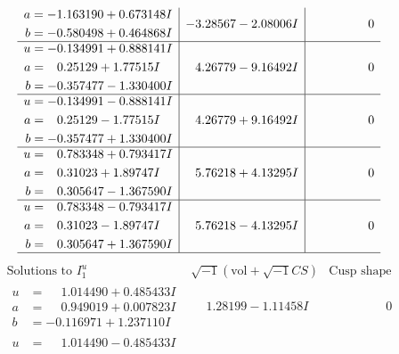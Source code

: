 \documentclass[1p]{elsarticle_modified}
\theoremstyle{definition}
\newcommand{\I}{\sqrt{-1}}
\begin{document}
$$\begin{array}{c|c|c}
\begin{aligned}
a &= -1.163190 + 0.673148 I \\
b &= -0.580498 + 0.464868 I\end{aligned}
 & -3.28567 - 2.08006 I & \phantom{-0.000000 } 0 \\ \hline\begin{aligned}
u &= -0.134991 + 0.888141 I \\
a &= \phantom{-}0.25129 + 1.77515 I \\
b &= -0.357477 - 1.330400 I\end{aligned}
 & \phantom{-}4.26779 - 9.16492 I & \phantom{-0.000000 } 0 \\ \hline\begin{aligned}
u &= -0.134991 - 0.888141 I \\
a &= \phantom{-}0.25129 - 1.77515 I \\
b &= -0.357477 + 1.330400 I\end{aligned}
 & \phantom{-}4.26779 + 9.16492 I & \phantom{-0.000000 } 0 \\ \hline\begin{aligned}
u &= \phantom{-}0.783348 + 0.793417 I \\
a &= \phantom{-}0.31023 + 1.89747 I \\
b &= \phantom{-}0.305647 - 1.367590 I\end{aligned}
 & \phantom{-}5.76218 + 4.13295 I & \phantom{-0.000000 } 0 \\ \hline\begin{aligned}
u &= \phantom{-}0.783348 - 0.793417 I \\
a &= \phantom{-}0.31023 - 1.89747 I \\
b &= \phantom{-}0.305647 + 1.367590 I\end{aligned}
 & \phantom{-}5.76218 - 4.13295 I & \phantom{-0.000000 } 0\\
 \hline 
 \end{array}$$\newpage$$\begin{array}{c|c|c}  
\text{Solutions to }I^u_{1}& \I (\text{vol} + \sqrt{-1}CS) & \text{Cusp shape}\\
 \hline 
\begin{aligned}
u &= \phantom{-}1.014490 + 0.485433 I \\
a &= \phantom{-}0.949019 + 0.007823 I \\
b &= -0.116971 + 1.237110 I\end{aligned}
 & \phantom{-}1.28199 - 1.11458 I & \phantom{-0.000000 } 0 \\ \hline\begin{aligned}
u &= \phantom{-}1.014490 - 0.485433 I \\

\end{aligned}
\end{array}$$
\end{document}
